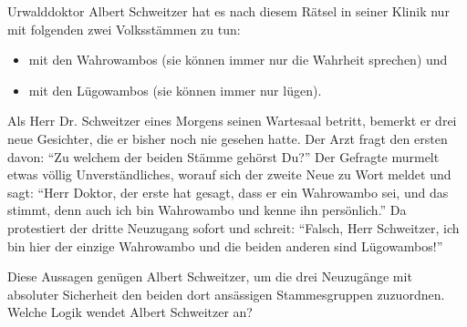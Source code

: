 \documentclass{zusammenfassung}
\begin{document}

\begin{aufgabe}
Urwalddoktor Albert Schweitzer hat es nach diesem Rätsel in seiner Klinik nur mit folgenden zwei Volksstämmen zu tun:

\begin{itemize}
  \item mit den Wahrowambos (sie können immer nur die Wahrheit sprechen) und
  \item mit den Lügowambos (sie können immer nur lügen).
\end{itemize}

Als Herr Dr. Schweitzer eines Morgens seinen Wartesaal betritt, bemerkt er drei neue Gesichter, die er bisher noch nie gesehen 
hatte. Der Arzt fragt den ersten davon: "`Zu welchem der beiden Stämme gehörst Du?"'
Der Gefragte murmelt etwas völlig Unverständliches, worauf sich der zweite Neue zu Wort meldet und sagt: 
"`Herr Doktor, der erste hat gesagt, dass er ein Wahrowambo sei, und das stimmt, denn auch ich bin Wahrowambo und kenne ihn 
persönlich."'
Da protestiert der dritte Neuzugang sofort und schreit: "`Falsch, Herr Schweitzer, ich bin hier der einzige Wahrowambo und die 
beiden anderen sind Lügowambos!"'

Diese Aussagen genügen Albert Schweitzer, um die drei Neuzugänge mit absoluter Sicherheit den beiden dort ansässigen 
Stammesgruppen zuzuordnen. Welche Logik wendet Albert Schweitzer an?
\end{aufgabe}

%
\end{document}
